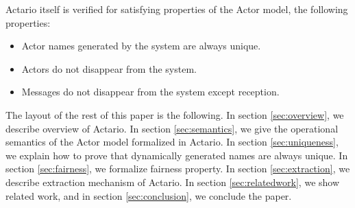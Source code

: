 Actario itself is verified for satisfying properties of the Actor model, the following properties:

\begin{itemize}
\item Actor names generated by the system are always unique.
\item Actors do not disappear from the system.
\item Messages do not disappear from the system except reception.
\end{itemize}





The layout of the rest of this paper is the following.
In section \ref{sec:overview}, we describe overview of Actario.
In section \ref{sec:semantics}, we give the operational semantics of the Actor model formalized in Actario.
In section \ref{sec:uniqueness}, we explain how to prove that dynamically generated names are always unique.
In section \ref{sec:fairness}, we formalize fairness property.
In section \ref{sec:extraction}, we describe extraction mechanism of Actario.
In section \ref{sec:relatedwork}, we show related work, and in section \ref{sec:conclusion}, we conclude the paper.


